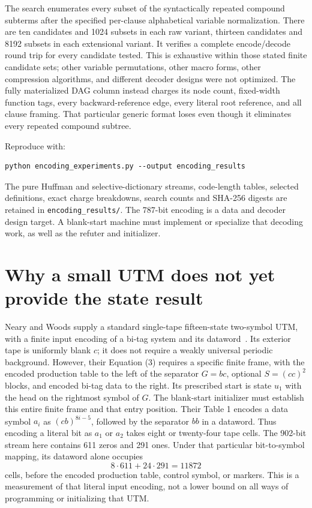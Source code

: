 The search enumerates every subset of the syntactically repeated
compound subterms after the specified per-clause alphabetical variable
normalization. There are ten candidates and 1024 subsets in each raw
variant, thirteen candidates and 8192 subsets in each extensional
variant. It verifies a complete encode/decode round trip for every
candidate tested. This is exhaustive within those stated finite candidate
sets; other variable permutations, other macro forms, other compression
algorithms, and different decoder designs were not optimized. The fully
materialized DAG column instead charges its node count, fixed-width
function tags, every backward-reference edge, every literal root
reference, and all clause framing. That particular generic format loses
even though it eliminates every repeated compound subtree.

Reproduce with:
\begin{verbatim}
python encoding_experiments.py --output encoding_results
\end{verbatim}
The pure Huffman and selective-dictionary streams, code-length tables,
selected definitions, exact charge breakdowns, search counts and SHA-256
digests are retained in \texttt{encoding\_results/}. The 787-bit encoding
is a data and decoder design target. A blank-start machine must implement
or specialize that decoding work, as well as the refuter and initializer.

\section{Why a small UTM does not yet provide the state result}

Neary and Woods supply a standard single-tape fifteen-state two-symbol
UTM, with a finite input encoding of a bi-tag system and its dataword~\cite{nearywoods2009}.
Its exterior tape is uniformly blank $c$; it does not require a weakly
universal periodic background. However, their Equation (3) requires a
specific finite frame, with the encoded production table to the left of
the separator $G=bc$, optional $S=(cc)^2$ blocks, and encoded bi-tag
data to the right. Its prescribed start is state $u_1$ with the head on
the rightmost symbol of $G$. The blank-start initializer must establish
this entire finite frame and that entry position.
Their Table 1 encodes a data symbol $a_i$ as $(cb)^{8i-5}$, followed by
the separator $bb$ in a dataword. Thus encoding a literal bit as $a_1$
or $a_2$ takes eight or twenty-four tape cells. The 902-bit stream here
contains 611 zeros and 291 ones. Under that particular bit-to-symbol
mapping, its dataword alone occupies
\[
 8\cdot611+24\cdot291=11872
\]
cells, before the encoded production table, control symbol, or markers.
This is a measurement of that literal input encoding, not a lower bound
on all ways of programming or initializing that UTM.

